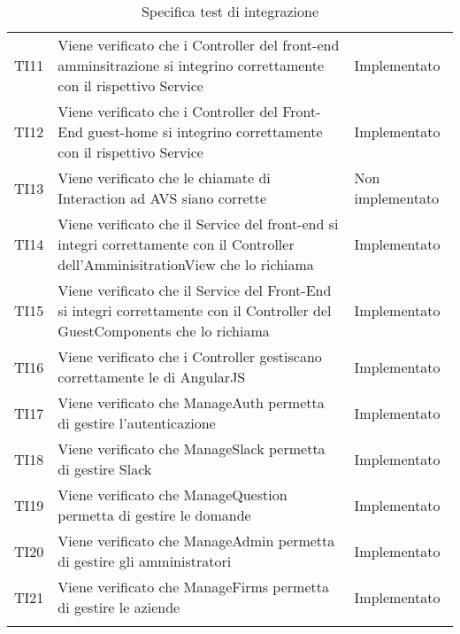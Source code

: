\documentclass[../PianoDiQualifica_v3.0.0.tex]{subfiles}
\begin{document}
\begin{longtable}[c] { >{\centering\arraybackslash}p{4cm} p{7cm} >{\centering\arraybackslash}p{4cm}}
			\midrule
			\addlinespace[0.3em]
			TI11 & Viene verificato che i Controller del front-end amminsitrazione si integrino correttamente con il rispettivo Service & Implementato \\
			\addlinespace[0.3em]
			\midrule
			\addlinespace[0.3em]
			TI12 & Viene verificato che i Controller del Front-End guest-home si integrino correttamente con il rispettivo Service & Implementato \\
			\addlinespace[0.3em]
			\midrule
			\addlinespace[0.3em]
			TI13 & Viene verificato che le chiamate di Interaction ad AVS siano corrette & Non implementato \\
			\addlinespace[0.3em]
			\midrule
			\addlinespace[0.3em]
			TI14 & Viene verificato che il Service del front-end si integri correttamente con il Controller dell'AmminisitrationView che lo richiama & Implementato \\
			\addlinespace[0.3em]
			\midrule
			\addlinespace[0.3em]
			TI15 & Viene verificato che il Service del Front-End si integri correttamente con il Controller del GuestComponents che lo richiama & Implementato \\
			\addlinespace[0.3em]
			\midrule
			\addlinespace[0.3em]
			TI16 & Viene verificato che i Controller gestiscano correttamente le \gl{root} di AngularJS & Implementato \\
			\addlinespace[0.3em]
			\midrule
			\addlinespace[0.3em]
			TI17 & Viene verificato che ManageAuth permetta di gestire l'autenticazione & Implementato \\
			\addlinespace[0.3em]
			\midrule
			\addlinespace[0.3em]
			TI18 & Viene verificato che ManageSlack permetta di gestire Slack & Implementato \\
			\addlinespace[0.3em]
			\midrule
			\addlinespace[0.3em]
			TI19 & Viene verificato che ManageQuestion permetta di gestire le domande & Implementato \\
			\addlinespace[0.3em]
			\midrule
			\addlinespace[0.3em]
			TI20 & Viene verificato che ManageAdmin permetta di gestire gli amministratori & Implementato \\
			\addlinespace[0.3em]
			\midrule
			\addlinespace[0.3em]
			TI21 & Viene verificato che ManageFirms permetta di gestire le aziende & Implementato \\
			\bottomrule
			\caption{Specifica test di integrazione}
	\end{longtable}

	\newpage
	\newpage
\end{document}
